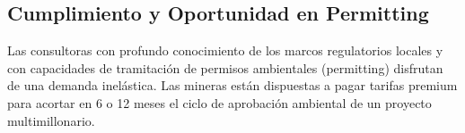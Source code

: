 \subsection{Cumplimiento y Oportunidad en Permitting}

Las consultoras con profundo conocimiento de los marcos regulatorios locales y con capacidades de tramitación de permisos ambientales (permitting) disfrutan de una demanda inelástica. Las mineras están dispuestas a pagar tarifas premium para acortar en 6 o 12 meses el ciclo de aprobación ambiental de un proyecto multimillonario.
